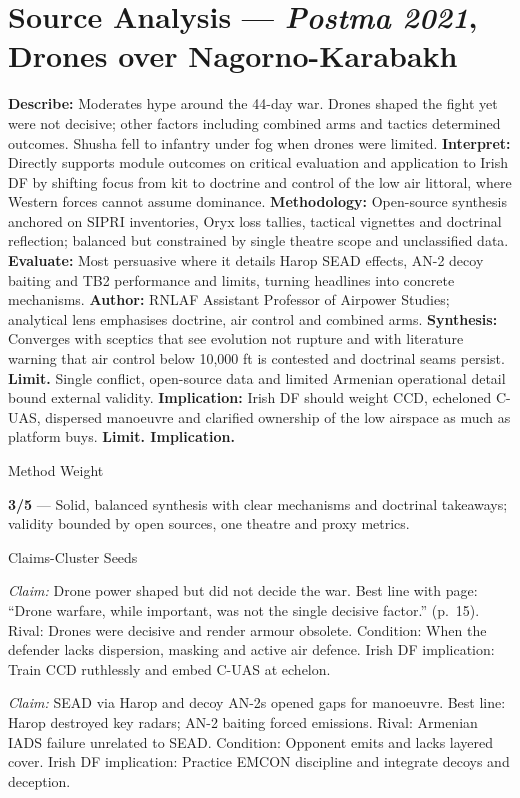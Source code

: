 \section*{Source Analysis — \textit{Postma 2021}, Drones over Nagorno\hyp Karabakh}
\textbf{Describe:} Moderates hype around the 44\hyp day war. Drones shaped the fight yet were not decisive; other factors including combined arms and tactics determined outcomes. Shusha fell to infantry under fog when drones were limited.
\textbf{Interpret:} Directly supports module outcomes on critical evaluation and application to Irish DF by shifting focus from kit to doctrine and control of the low air littoral, where Western forces cannot assume dominance.
\textbf{Methodology:} Open\hyp source synthesis anchored on SIPRI inventories, Oryx loss tallies, tactical vignettes and doctrinal reflection; balanced but constrained by single theatre scope and unclassified data.
\textbf{Evaluate:} Most persuasive where it details Harop SEAD effects, AN\hyp2 decoy baiting and TB2 performance and limits, turning headlines into concrete mechanisms.
\textbf{Author:} RNLAF Assistant Professor of Airpower Studies; analytical lens emphasises doctrine, air control and combined arms.
\textbf{Synthesis:} Converges with sceptics that see evolution not rupture and with literature warning that air control below 10,000 ft is contested and doctrinal seams persist.
\textbf{Limit.} Single conflict, open\hyp source data and limited Armenian operational detail bound external validity.
\textbf{Implication:} Irish DF should weight CCD, echeloned C\hyp UAS, dispersed manoeuvre and clarified ownership of the low airspace as much as platform buys. \textbf{Limit. Implication.}

Method Weight

\textbf{3/5} — Solid, balanced synthesis with clear mechanisms and doctrinal takeaways; validity bounded by open sources, one theatre and proxy metrics.

Claims-Cluster Seeds

\textit{Claim:} Drone power shaped but did not decide the war.
Best line with page: “Drone warfare, while important, was not the single decisive factor.” (p.~15). Rival: Drones were decisive and render armour obsolete. Condition: When the defender lacks dispersion, masking and active air defence. Irish DF implication: Train CCD ruthlessly and embed C\hyp UAS at echelon.

\textit{Claim:} SEAD via Harop and decoy AN\hyp2s opened gaps for manoeuvre.
Best line: Harop destroyed key radars; AN\hyp2 baiting forced emissions. Rival: Armenian IADS failure unrelated to SEAD. Condition: Opponent emits and lacks layered cover. Irish DF implication: Practice EMCON discipline and integrate decoys and deception.

